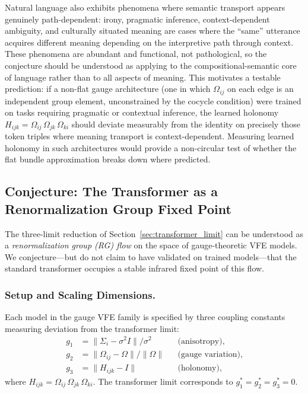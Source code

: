 \documentclass[twoside,11pt]{article}
\begin{document}
Natural language also exhibits phenomena where semantic transport appears genuinely path-dependent: irony, pragmatic inference, context-dependent ambiguity, and culturally situated meaning are cases where the ``same'' utterance acquires different meaning depending on the interpretive path through context. These phenomena are abundant and functional, not pathological, so the conjecture should be understood as applying to the compositional-semantic core of language rather than to all aspects of meaning. This motivates a testable prediction: if a non-flat gauge architecture (one in which $\Omega_{ij}$ on each edge is an independent group element, unconstrained by the cocycle condition) were trained on tasks requiring pragmatic or contextual inference, the learned holonomy $H_{ijk} = \Omega_{ij}\,\Omega_{jk}\,\Omega_{ki}$ should deviate measurably from the identity on precisely those token triples where meaning transport is context-dependent. Measuring learned holonomy in such architectures would provide a non-circular test of whether the flat bundle approximation breaks down where predicted.

\subsection{Conjecture: The Transformer as a Renormalization Group Fixed Point}
\label{sec:rg_universality}

The three-limit reduction of Section~\ref{sec:transformer_limit} can be understood as a \emph{renormalization group (RG) flow} on the space of gauge-theoretic VFE models. We conjecture---but do not claim to have validated on trained models---that the standard transformer occupies a stable infrared fixed point of this flow.

\subsubsection{Setup and Scaling Dimensions.}

Each model in the gauge VFE family is specified by three coupling constants measuring deviation from the transformer limit:
\begin{align}
g_1 &= \|\Sigma_i - \sigma^2 I\| / \sigma^2 & &\text{(anisotropy)}, \label{eq:g1_def} \\
g_2 &= \|\Omega_{ij} - \Omega\| / \|\Omega\| & &\text{(gauge variation)}, \label{eq:g2_def} \\
g_3 &= \|H_{ijk} - I\| & &\text{(holonomy)}, \label{eq:g3_def}
\end{align}
where $H_{ijk} = \Omega_{ij}\,\Omega_{jk}\,\Omega_{ki}$.  The transformer limit corresponds to $g_1^* = g_2^* = g_3^* = 0$.
\end{document}
